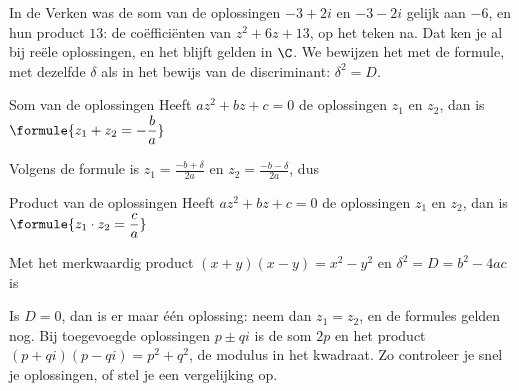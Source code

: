 In de Verken was de som van de oplossingen $-3 + 2i$ en $-3 - 2i$ gelijk aan $-6$, en hun product $13$: de coëfficiënten van $z^2 + 6z + 13$, op het teken na. Dat ken je al bij reële oplossingen, en het blijft gelden in $\C$. We bewijzen het met de formule, met dezelfde $\delta$ als in het bewijs van de discriminant: $\delta^2 = D$.

\begin{theorie}
\begin{stelling}{Som van de oplossingen}
Heeft $az^2 + bz + c = 0$ de oplossingen $z_1$ en $z_2$, dan is \quad $\formule{z_1 + z_2 = -\dfrac{b}{a}}$
\end{stelling}

\begin{bewijs}
Volgens de formule is $z_1 = \frac{-b + \delta}{2a}$ en $z_2 = \frac{-b - \delta}{2a}$, dus
\end{bewijs}

\begin{stelling}{Product van de oplossingen}
Heeft $az^2 + bz + c = 0$ de oplossingen $z_1$ en $z_2$, dan is \quad $\formule{z_1 \cdot z_2 = \dfrac{c}{a}}$
\end{stelling}

\begin{bewijs}
Met het merkwaardig product $(x + y)(x - y) = x^2 - y^2$ en $\delta^2 = D = b^2 - 4ac$ is
\end{bewijs}
\end{theorie}

Is $D = 0$, dan is er maar één oplossing: neem dan $z_1 = z_2$, en de formules gelden nog. Bij toegevoegde oplossingen $p \pm qi$ is de som $2p$ en het product $(p + qi)(p - qi) = p^2 + q^2$, de modulus in het kwadraat. Zo controleer je snel je oplossingen, of stel je een vergelijking op.


